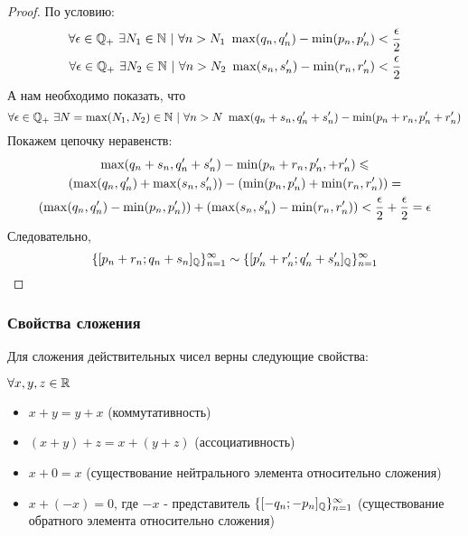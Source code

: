 \begin{proof}
    По условию:
    \begin{align*}
        \forall \epsilon \in \mathbb{Q}_+\ \exists N_1 \in \mathbb{N}\ |\ \forall n > N_1\ \max(q_n, q'_n) - \min(p_n, p'_n) < \frac{\epsilon}{2} \\
        \forall \epsilon \in \mathbb{Q}_+\ \exists N_2 \in \mathbb{N}\ |\ \forall n > N_2\ \max(s_n, s'_n) - \min(r_n, r'_n) < \frac{\epsilon}{2}
    \end{align*}
    А нам необходимо показать, что
    $$
        \forall \epsilon \in \mathbb{Q}_+\ \exists N = \max(N_1, N_2) \in \mathbb{N}\ |\ \forall n > N\ \max(q_n + s_n, q'_n + s'_n) - \min(p_n + r_n, p'_n + r'_n)
    $$
    Покажем цепочку неравенств:
    \begin{multline}
        \max(q_n + s_n, q'_n + s'_n) - \min(p_n + r_n, p'_n, + r'_n) \leqslant \\
        (\max(q_n, q'_n) + \max(s_n, s'_n)) - (\min(p_n, p'_n) + \min(r_n, r'_n)) = \\
        (\max(q_n, q'_n) - \min(p_n, p'_n)) + (\max(s_n, s'_n) - \min(r_n, r'_n)) < \frac{\epsilon}{2} + \frac{\epsilon}{2} = \epsilon
    \end{multline}
    Следовательно,
    $$
        \{[p_n + r_n; q_n + s_n]_{\mathbb{Q}}\}_{n = 1}^\infty \sim \{[p'_n + r'_n; q'_n + s'_n]_{\mathbb{Q}}\}_{n = 1}^\infty
    $$
\end{proof}

\subsubsection{Свойства сложения}

Для сложения действительных чисел верны следующие свойства:

$\forall x, y, z \in \mathbb{R}$
\begin{itemize}
    \item $x + y = y + x$ (коммутативность)
    \item $(x + y) + z = x + (y + z)$ (ассоциативность)
    \item $x + 0 = x$ (существование нейтрального элемента относительно сложения)
    \item $x + (-x) = 0$, где $-x$ - представитель $\{[-q_n; -p_n]_{\mathbb{Q}}\}_{n = 1}^\infty$ (существование обратного элемента относительно сложения)
\end{itemize}